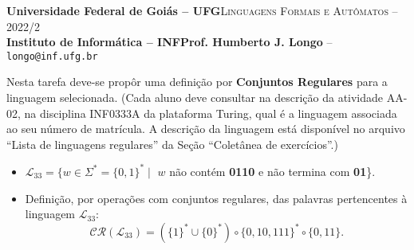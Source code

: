 \documentclass[12pt]{article}
\def\discente{Iury Alexandre Alves Bo}
\def\matricula{202103735}
\def\ua{02}
\def\myling{{33}} %
\newcommand{\concatL}{\ensuremath{{\scriptstyle\circ}}}%
\begin{document}
 \begin{tcolorbox}[rounded corners, colback=blue!3, colframe=blue!40!black]
  \footnotesize\textbf{Universidade Federal de Goiás -- UFG}\hfill \textsc{Linguagens Formais e Autômatos -- 2022/2}\\
  \footnotesize\textbf{Instituto de Informática -- INF\hfill Prof. Humberto J. Longo} -- \scriptsize\texttt{longo@inf.ufg.br}
 \end{tcolorbox}\bigskip
%
\begin{tcolorbox}[rounded corners, colback=blue!2, colframe=blue!40!black, title=\textbf{Atividade AA-\ua}]
   Nesta tarefa deve-se propôr uma definição por \textbf{Conjuntos Regulares} para a linguagem selecionada. (Cada aluno deve consultar na descrição da atividade AA-\ua, na disciplina INF0333A da plataforma Turing, qual é a linguagem associada ao seu número de matrícula. A descrição da linguagem está disponível no arquivo ``Lista de linguagens regulares'' da Seção ``Coletânea de exercícios''.)
\end{tcolorbox}\bigskip
%
%
\begin{tcolorbox}[rounded corners, colback=yellow!5, colframe=red!40!black, title=\textbf{\matricula\ -- \discente}]
 \begin{itemize}[leftmargin=*]
  \item $\mathcal{L}_\myling = \{w\in\Sigma^* = \{0,1\}^*\mid$ $w$ não contém \textbf{0110} e não termina com \textbf{01}\}.

  \item Definição, por operações com conjuntos regulares, das palavras pertencentes à linguagem $\mathcal{L}_\myling$:
   $$\mathcal{CR}(\mathcal{L}_\myling) =
    (\{1\}^*\cup\{0\}^*)\concatL\{0,10,111\}^*\concatL\{0,11\}
   .$$
 \end{itemize}
\end{tcolorbox}

%
\end{document}
